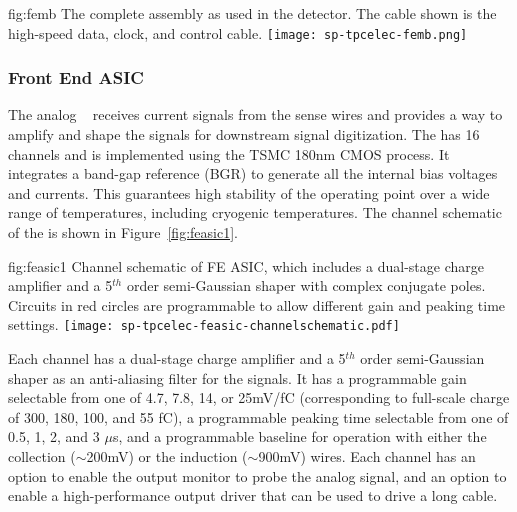 \begin{dunefigure}
{fig:femb}
{The complete  assembly as used in the  detector. The cable shown is the high-speed data, clock, and control cable.}
\texttt{[image: sp-tpcelec-femb.png]}
\end{dunefigure}

\subsubsection{Front End ASIC}
\label{sec:fdsp-tpcelec-design-femb-fe}

The analog  ~\cite{DeGeronimo:2011zz} receives current signals from the  sense wires and provides a way to amplify and shape the signals for downstream signal digitization.  The   has 16 channels and is implemented using the TSMC 180nm CMOS process. It integrates a band-gap reference (BGR)  to generate all the internal bias voltages and currents. This guarantees high stability of the operating point over a wide range of temperatures, including cryogenic temperatures. The channel schematic of the   is shown in Figure~\ref{fig:feasic1}. 

\begin{dunefigure}
{fig:feasic1}
{Channel schematic of FE ASIC, which includes a dual-stage charge amplifier and a 5$^{th}$ order semi-Gaussian shaper with complex conjugate poles. Circuits in red circles are programmable to allow different gain and peaking time settings.}
\texttt{[image: sp-tpcelec-feasic-channelschematic.pdf]}
\end{dunefigure}

Each   channel has a dual-stage charge amplifier and a 5$^{th}$ order semi-Gaussian shaper as an anti-aliasing filter for the  signals. It has a programmable gain selectable from one of 4.7, 7.8, 14, or 25mV/fC (corresponding to full-scale charge of 300, 180, 100, and 55 fC), a programmable peaking time selectable from one of 0.5, 1, 2, and 3 $\mu$s, and a programmable baseline for operation with either the collection ($\sim$200mV) or the induction ($\sim$900mV) wires. Each channel has an option to enable the output monitor to probe the analog signal, and an option to enable a high-performance output driver that can be used to drive a long cable. 


